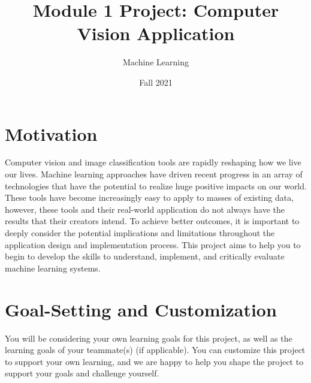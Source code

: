\documentclass{tufte-handout}
\title{Module 1 Project: Computer Vision Application}
\author{Machine Learning}
\date{Fall 2021}
\begin{document}
\maketitle
\thispagestyle{firstpage}

%

\section*{Motivation}

Computer vision and image classification tools are rapidly reshaping how we live our lives. Machine learning approaches have driven recent progress in an array of technologies that have the potential to realize huge positive impacts on our world. These tools have become increasingly easy to apply to masses of existing data, however, these tools and their real-world application do not always have the results that their creators intend. To achieve better outcomes, it is important to deeply consider the potential implications and limitations throughout the application design and implementation process. This project aims to help you to begin to develop the skills to understand, implement, and critically evaluate machine learning systems. 

\section*{Goal-Setting and Customization}

You will be considering your own learning goals for this project, as well as the learning goals of your teammate(s) (if applicable).
 You can customize this project to support your own learning, and we are happy to help you shape the project to support your goals and challenge yourself. 
\end{document}
